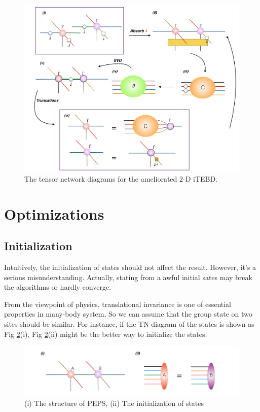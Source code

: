 \begin{figure}[ht]
	\centering
	\includegraphics[width=1.00\textwidth]{figures/fig317.png}
	\caption[The tensor network diagrams for the 2-D iTEBD with QR decomposition]{The tensor network diagrams for the ameliorated 2-D iTEBD.}
	\label{fig317}
\end{figure}

\section{Optimizations}
\label{2dopt}

\subsection{Initialization}
\label{2doptInit}
Intuitively, the initialization of states should not affect the result. However, it's a serious misunderstanding. Actually, stating from a awful initial sates may break the algorithms or hardly converge.

From the viewpoint of physics, translational invariance is one of essential properties in many-body system, So we can assume that the group state on two sites should be similar. For instance, if the TN diagram of the states is shown as Fig \ref{fig321}(i), Fig \ref{fig321}(ii) might be the better way to initialize the states.

\begin{figure}[ht]
	\centering
	\includegraphics[width=1.00\textwidth]{figures/fig321.png}
	\caption[The diagrams of initializing projected entangled pair states]{(i) The structure of PEPS, (ii) The initialization of states}
	\label{fig321}
\end{figure}


